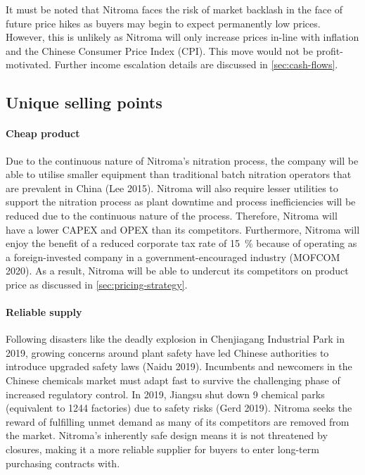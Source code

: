 It must be noted that Nitroma faces the risk of market backlash in the face of future price hikes as buyers may begin to expect permanently low prices. However, this is unlikely as Nitroma will only increase prices in-line with inflation and the Chinese Consumer Price Index (CPI). This move would not be profit-motivated. Further income escalation details are discussed in \cref{sec:cash-flows}.

\subsection{Unique selling points}
\label{sec:USP}
\paragraph{Cheap product}
Due to the continuous nature of Nitroma’s nitration process, the company will be able to utilise smaller equipment than traditional batch nitration operators that are prevalent in China (Lee 2015). Nitroma will also require lesser utilities to support the nitration process as plant downtime and process inefficiencies will be reduced due to the continuous nature of the process. Therefore, Nitroma will have a lower CAPEX and OPEX than its competitors. Furthermore, Nitroma will enjoy the benefit of a reduced corporate tax rate of \SI{15}{\percent} because of operating as a foreign-invested company in a government-encouraged industry (MOFCOM 2020). As a result, Nitroma will be able to undercut its competitors on product price as discussed in \cref{sec:pricing-strategy}.

\paragraph{Reliable supply}
Following disasters like the deadly explosion in Chenjiagang Industrial Park in 2019, growing concerns around plant safety have led Chinese authorities to introduce upgraded safety laws (Naidu 2019). Incumbents and newcomers in the Chinese chemicals market must adapt fast to survive the challenging phase of increased regulatory control. In 2019, Jiangsu shut down 9 chemical parks (equivalent to 1244 factories) due to safety risks (Gerd 2019). Nitroma seeks the reward of fulfilling unmet demand as many of its competitors are removed from the market. Nitroma’s inherently safe design means it is not threatened by closures, making it a more reliable supplier for buyers to enter long-term purchasing contracts with.

